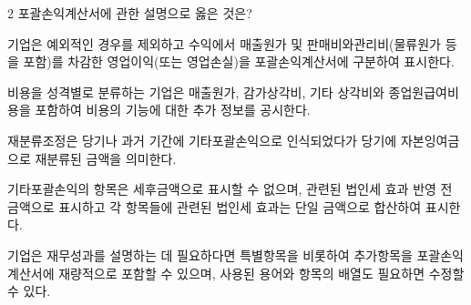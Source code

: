 \begin{question}{2}
포괄손익계산서에 관한 설명으로 옳은 것은?
\begin{choices}
  \item 기업은 예외적인 경우를 제외하고 수익에서 매출원가 및 판매비와관리비(물류원가 등을 포함)를 차감한 영업이익(또는 영업손실)을 포괄손익계산서에 구분하여 표시한다.
  \item 비용을 성격별로 분류하는 기업은 매출원가, 감가상각비, 기타 상각비와 종업원급여비용을 포함하여 비용의 기능에 대한 추가 정보를 공시한다.
  \item 재분류조정은 당기나 과거 기간에 기타포괄손익으로 인식되었다가 당기에 자본잉여금으로 재분류된 금액을 의미한다.
  \item 기타포괄손익의 항목은 세후금액으로 표시할 수 없으며, 관련된 법인세 효과 반영 전 금액으로 표시하고 각 항목들에 관련된 법인세 효과는 단일 금액으로 합산하여 표시한다.
  \item 기업은 재무성과를 설명하는 데 필요하다면 특별항목을 비롯하여 추가항목을 포괄손익계산서에 재량적으로 포함할 수 있으며, 사용된 용어와 항목의 배열도 필요하면 수정할 수 있다.
\end{choices}
\end{question}
